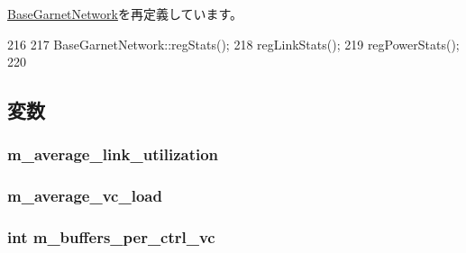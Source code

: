 \hyperlink{classBaseGarnetNetwork_a4dc637449366fcdfc4e764cdf12d9b11}{BaseGarnetNetwork}を再定義しています。


\begin{DoxyCode}
216 {
217     BaseGarnetNetwork::regStats();
218     regLinkStats();
219     regPowerStats();
220 }
\end{DoxyCode}


\subsection{変数}
\hypertarget{classGarnetNetwork__d_a980fb21ae994fd27b0f9a935aa21edee}{
\subsubsection[{m\_\-average\_\-link\_\-utilization}]{ {\bf m\_\-average\_\-link\_\-utilization}}}
\label{classGarnetNetwork__d_a980fb21ae994fd27b0f9a935aa21edee}
\hypertarget{classGarnetNetwork__d_aeaf247f4cb25e8bbafa5d0e629e6be10}{
\subsubsection[{m\_\-average\_\-vc\_\-load}]{ {\bf m\_\-average\_\-vc\_\-load}}}
\label{classGarnetNetwork__d_aeaf247f4cb25e8bbafa5d0e629e6be10}
\hypertarget{classGarnetNetwork__d_a800b6444deb08b282d4fe86c1cba0447}{
\subsubsection[{m\_\-buffers\_\-per\_\-ctrl\_\-vc}]{\setlength{\rightskip}{0pt plus 5cm}int {\bf m\_\-buffers\_\-per\_\-ctrl\_\-vc}}}
